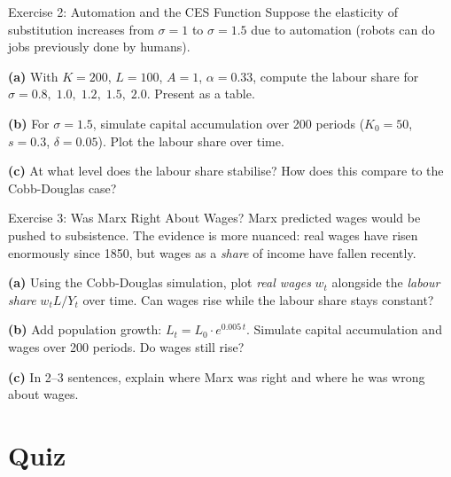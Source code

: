 \documentclass[aspectratio=169, 10pt]{beamer}
\begin{document}
\begin{frame}{Exercise 2: Automation and the CES Function}
Suppose the elasticity of substitution increases from $\sigma = 1$
to $\sigma = 1.5$ due to automation (robots can do jobs previously
done by humans).
\vspace{0.5em}

\textbf{(a)} With $K = 200$, $L = 100$, $A = 1$, $\alpha = 0.33$,
compute the labour share for $\sigma = 0.8,\; 1.0,\; 1.2,\; 1.5,\; 2.0$.
Present as a table.
\vspace{0.5em}

\textbf{(b)} For $\sigma = 1.5$, simulate capital accumulation over
200 periods ($K_0 = 50$, $s = 0.3$, $\delta = 0.05$). Plot the
labour share over time.
\vspace{0.5em}

\textbf{(c)} At what level does the labour share stabilise?
How does this compare to the Cobb-Douglas case?
\end{frame}

\begin{frame}{Exercise 3: Was Marx Right About Wages?}
Marx predicted wages would be pushed to subsistence. The evidence is
more nuanced: real wages have risen enormously since 1850, but wages
as a \textit{share} of income have fallen recently.
\vspace{0.5em}

\textbf{(a)} Using the Cobb-Douglas simulation, plot \textit{real wages}
$w_t$ alongside the \textit{labour share} $w_t L / Y_t$ over time.
Can wages rise while the labour share stays constant?
\vspace{0.5em}

\textbf{(b)} Add population growth: $L_t = L_0 \cdot e^{0.005\,t}$.
Simulate capital accumulation and wages over 200 periods. Do wages
still rise?
\vspace{0.5em}

\textbf{(c)} In 2--3 sentences, explain where Marx was right and where
he was wrong about wages.
\end{frame}

\section{Quiz}
\end{document}
